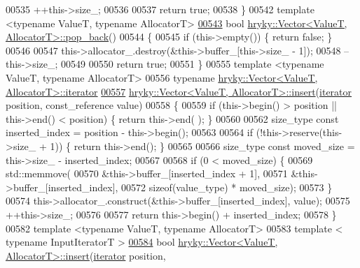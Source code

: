 \begin{DoxyCode}
00535     ++this->size\_;
00536 
00537     \textcolor{keywordflow}{return} \textcolor{keyword}{true};
00538 \}
00542 \textcolor{keyword}{template} <\textcolor{keyword}{typename} ValueT, \textcolor{keyword}{typename} AllocatorT>
\hypertarget{vector_8h_source_l00543}{}\hyperlink{classhryky_1_1_vector_ab66b1fda88244ae10810c7e883d34d6f}{00543} \textcolor{keywordtype}{bool} \hyperlink{classhryky_1_1_vector}{hryky::Vector<ValueT, AllocatorT>::pop_back}()
00544 \{
00545     \textcolor{keywordflow}{if} (this->empty()) \{ \textcolor{keywordflow}{return} \textcolor{keyword}{false}; \}
00546 
00547     this->allocator\_.destroy(&this->buffer\_[this->size\_ - 1]);
00548     --this->size\_;
00549 
00550     \textcolor{keywordflow}{return} \textcolor{keyword}{true};
00551 \}
00555 \textcolor{keyword}{template} <\textcolor{keyword}{typename} ValueT, \textcolor{keyword}{typename} AllocatorT>
00556 \textcolor{keyword}{typename} \hyperlink{classhryky_1_1iterator_1_1random_1_1_mutable}{hryky::Vector<ValueT, AllocatorT>::iterator}
\hypertarget{vector_8h_source_l00557}{}\hyperlink{classhryky_1_1_vector_a5056ac0ef6663b935bea8271c33ff126}{00557} \hyperlink{classhryky_1_1_vector}{hryky::Vector<ValueT, AllocatorT>::insert}(\hyperlink{classhryky_1_1iterator_1_1random_1_1_mutable}{iterator} position, const\_reference 
      value)
00558 \{
00559     \textcolor{keywordflow}{if} (this->begin() > position || this->end() < position) \{ \textcolor{keywordflow}{return} this->end(
      ); \}
00560 
00562     size\_type \textcolor{keyword}{const} inserted\_index = position - this->begin();
00563     
00564     \textcolor{keywordflow}{if} (!this->reserve(this->size\_ + 1)) \{ \textcolor{keywordflow}{return} this->end(); \}
00565 
00566     size\_type \textcolor{keyword}{const} moved\_size      = this->size\_ - inserted\_index;
00567 
00568     \textcolor{keywordflow}{if} (0 < moved\_size) \{
00569         std::memmove(
00570             &this->buffer\_[inserted\_index + 1],
00571             &this->buffer\_[inserted\_index],
00572             \textcolor{keyword}{sizeof}(value\_type) * moved\_size);
00573     \}
00574     this->allocator\_.construct(&this->buffer\_[inserted\_index], value);
00575     ++this->size\_;
00576 
00577     \textcolor{keywordflow}{return} this->begin() + inserted\_index;
00578 \}
00582 \textcolor{keyword}{template} <\textcolor{keyword}{typename} ValueT, \textcolor{keyword}{typename} AllocatorT>
00583 \textcolor{keyword}{template} < \textcolor{keyword}{typename} InputIteratorT >
\hypertarget{vector_8h_source_l00584}{}\hyperlink{classhryky_1_1_vector_aea52cb653910c83ccb2951f1e5d51d7d}{00584} \textcolor{keywordtype}{bool} \hyperlink{classhryky_1_1_vector}{hryky::Vector<ValueT, AllocatorT>::insert}(\hyperlink{classhryky_1_1iterator_1_1random_1_1_mutable}{iterator} position, 

\end{DoxyCode}
